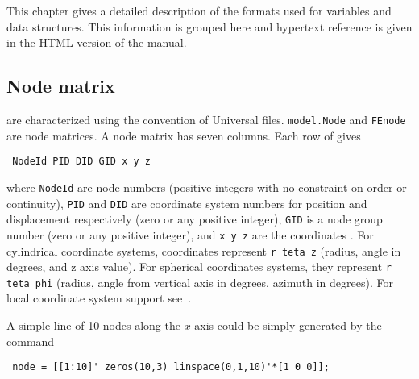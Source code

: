 


This chapter gives a detailed description of the formats used for variables and data structures. This information is grouped here and hypertext reference is given in the HTML version of the manual.


%

\subsection{Node matrix}


 are characterized using the convention of Universal files.  {\tt model.Node} and {\tt FEnode} are node matrices. A node matrix has seven columns.  Each row of gives

\begin{verbatim}
 NodeId PID DID GID x y z 
\end{verbatim}

\noindent where {\tt NodeId} are node numbers (positive integers with no constraint on order or continuity), {\tt PID} and {\tt DID} are coordinate system numbers for position and displacement respectively (zero or any positive integer), {\tt GID} is a node group number 
(zero or any positive integer), and {\tt x y z} are the coordinates . For cylindrical coordinate systems, coordinates represent {\tt r teta z} (radius, angle in degrees, and z axis value). For spherical coordinates systems, they represent {\tt r teta phi} (radius, angle from vertical axis in degrees, azimuth in degrees). For local coordinate system support see~.


\vs A simple line of 10 nodes along the $x$ axis could be simply generated by the command

\begin{verbatim}
 node = [[1:10]' zeros(10,3) linspace(0,1,10)'*[1 0 0]]; 
\end{verbatim}

